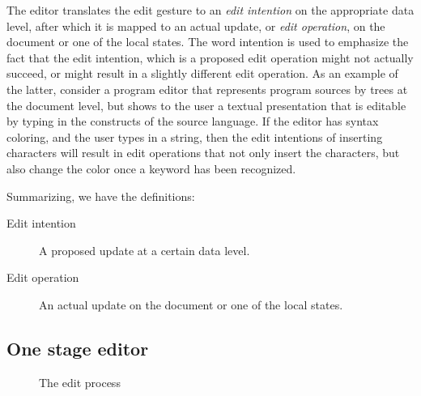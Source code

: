 The editor translates the edit gesture to an {\em edit intention} on the appropriate data level, after which it is mapped to an actual update, or {\em edit operation}, on the document or one of the local states. The word intention is used to emphasize the fact that the edit intention, which is a proposed edit operation might not actually succeed, or might result in a slightly different edit operation. As an example of the latter, consider a program editor that represents program sources by trees at the document level, but shows to the user a textual presentation that is editable by typing in the constructs of the source language. If the editor has syntax coloring, and the user types in a string, then the edit intentions of inserting characters will result in edit operations that not only insert the characters, but also change the color once a keyword has been recognized. 

Summarizing, we have the definitions:
 \begin{description}
 
 \item[Edit intention]
A proposed update at a certain data level.
 \item[Edit operation ]
An actual update on the document or one of the local states.
 \end{description}

\subsection{One stage editor}
\label{subsectsingleedit}
\begin{figure}
\begin{small}
\begin{center}
\begin{center}
\begin{small}
\bigskip \noindent
{}
\end{small}
\end{center}\caption{ The edit process}\label{editprocess} 
\end{center}
\end{small}
\end{figure}


